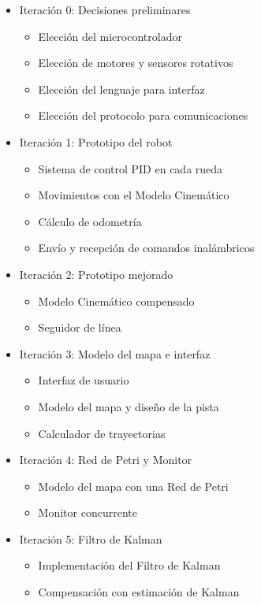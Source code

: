 \begin{itemize}
    \item Iteración 0: Decisiones preliminares
    \begin{itemize}
        \item Elección del microcontrolador
        \item Elección de motores y sensores rotativos
        \item Elección del lenguaje para interfaz
        \item Elección del protocolo para comunicaciones
    \end{itemize}

    \item Iteración 1: Prototipo del robot
    \begin{itemize}
        \item Sistema de control PID en cada rueda
        \item Movimientos con el Modelo Cinemático
        \item Cálculo de odometría
        \item Envío y recepción de comandos inalámbricos
    \end{itemize}

    \item Iteración 2: Prototipo mejorado
    \begin{itemize}
        \item Modelo Cinemático compensado
        \item Seguidor de línea
    \end{itemize}

    \item Iteración 3: Modelo del mapa e interfaz
    \begin{itemize}
        \item Interfaz de usuario
        \item Modelo del mapa y diseño de la pista
        \item Calculador de trayectorias
    \end{itemize}

    \item Iteración 4: Red de Petri y Monitor
    \begin{itemize}
        \item Modelo del mapa con una Red de Petri
        \item Monitor concurrente
    \end{itemize}

    \item Iteración 5: Filtro de Kalman
    \begin{itemize}
        \item Implementación del Filtro de Kalman
        \item Compensación con estimación de Kalman
    \end{itemize}


\end{itemize}
